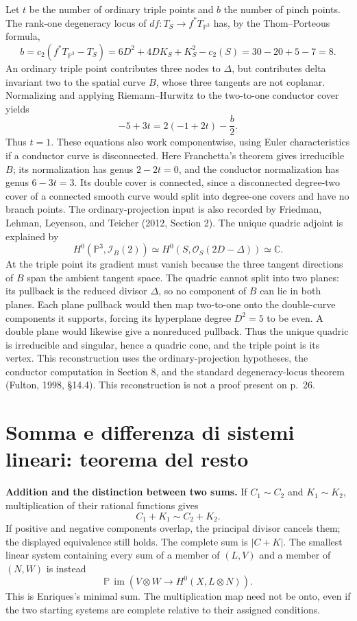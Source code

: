 Let \(t\) be the number of ordinary triple points and \(b\) the number of pinch points. The rank-one degeneracy locus of \(df:T_S\to f^*T_{\mathbb P^3}\) has, by the Thom--Porteous formula, \[
b=c_2(f^*T_{\mathbb P^3}-T_S)
 =6D^2+4D K_S+K_S^2-c_2(S)
 =30-20+5-7=8.
\] An ordinary triple point contributes three nodes to \(\Delta\), but contributes delta invariant two to the spatial curve \(B\), whose three tangents are not coplanar. Normalizing and applying Riemann--Hurwitz to the two-to-one conductor cover yields \[
-5+3t=2(-1+2t)-\frac b2.
\] Thus \(t=1\). These equations also work componentwise, using Euler characteristics if a conductor curve is disconnected. Here Franchetta's theorem gives irreducible \(B\); its normalization has genus \(2-2t=0\), and the conductor normalization has genus \(6-3t=3\). Its double cover is connected, since a disconnected degree-two cover of a connected smooth curve would split into degree-one covers and have no branch points. The ordinary-projection input is also recorded by Friedman, Lehman, Leyenson, and Teicher (2012, Section 2). The unique quadric adjoint is explained by \[
H^0(\mathbb P^3,\mathcal I_B(2))
\simeq H^0(S,\mathcal O_S(2D-\Delta))
\simeq\mathbb C.
\] At the triple point its gradient must vanish because the three tangent directions of \(B\) span the ambient tangent space. The quadric cannot split into two planes: its pullback is the reduced divisor \(\Delta\), so no component of \(B\) can lie in both planes. Each plane pullback would then map two-to-one onto the double-curve components it supports, forcing its hyperplane degree \(D^2=5\) to be even. A double plane would likewise give a nonreduced pullback. Thus the unique quadric is irreducible and singular, hence a quadric cone, and the triple point is its vertex. This reconstruction uses the ordinary-projection hypotheses, the conductor computation in Section 8, and the standard degeneracy-locus theorem (Fulton, 1998, §14.4). This reconstruction is not a proof present on p.~26.

\section[Somma e differenza di sistemi lineari]{Somma e differenza di sistemi lineari: teorema del resto}
\label{enriques-I-8}

\textbf{Addition and the distinction between two sums.} If \(C_1\sim C_2\) and \(K_1\sim K_2\), multiplication of their rational functions gives \[
C_1+K_1\sim C_2+K_2.
\] If positive and negative components overlap, the principal divisor cancels them; the displayed equivalence still holds. The complete sum is \(|C+K|\). The smallest linear system containing every sum of a member of \((L,V)\) and a member of \((N,W)\) is instead \[
\mathbb P\,\operatorname{im}
\left(V\otimes W\longrightarrow H^0(X,L\otimes N)\right).
\] This is Enriques's minimal sum. The multiplication map need not be onto, even if the two starting systems are complete relative to their assigned conditions.


